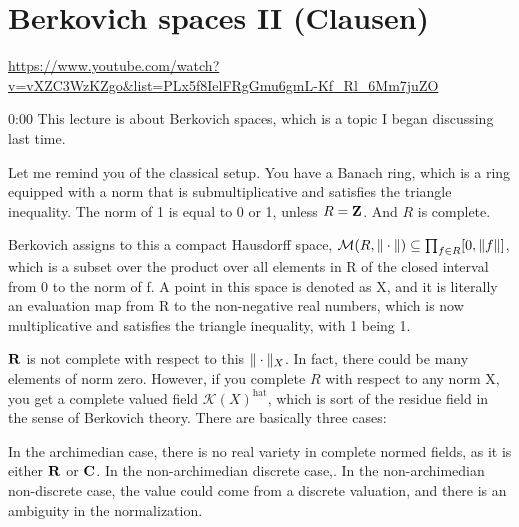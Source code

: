 
\section{\ufs Berkovich spaces II (Clausen)}

\url{https://www.youtube.com/watch?v=vXZC3WzKZgo&list=PLx5f8IelFRgGmu6gmL-Kf_Rl_6Mm7juZO}
\renewcommand{\yt}[2]{\href{https://www.youtube.com/watch?v=vXZC3WzKZgo&list=PLx5f8IelFRgGmu6gmL-Kf_Rl_6Mm7juZO&t=#1}{#2}}
\vspace{1em}

\begin{unfinished}{0:00}
This lecture is about Berkovich spaces, which is a topic I began discussing last time.

Let me remind you of the classical setup. You have a Banach ring, which is a ring equipped with a norm that is submultiplicative and satisfies the triangle inequality. The norm of 1 is equal to 0 or 1, unless $R = \mathbf Z$. And $R$ is complete.


Berkovich assigns to this a compact Hausdorff space, $\mathcal{M}(R, \| \cdot \|) \subseteq \prod_{f \in R} [ 0, \| f \| ]$, which is a subset over the product over all elements in R of the closed interval from 0 to the norm of f. A point in this space is denoted as X, and it is literally an evaluation map from R to the non-negative real numbers, which is now multiplicative and satisfies the triangle inequality, with 1 being 1.

\begin{remark}
$\R$ is not complete with respect to this $\norm{\cdot}_X$. In fact, there could be many elements of norm zero. However, if you complete $R$ with respect to any norm X, you get a complete valued field $\mathcal{K}(X)^{\text{hat}}$, which is sort of the residue field in the sense of Berkovich theory.
There are basically three cases:
\begin{enumerate}
\item archimedian $\iff$ $(\R, \norm{\cdot}^{\alpha})$ or $(\C, \norm{\cdot}^{\alpha)$, $\alpha \in [0, 1]$
\item non-archimedian but discrete, then you have the trivial norm $\norm{\cdot}_0 = \text{trivial norm}$
\item non-archimedian non-discrete, $\norm{\cdot}_{normalize}^{\alpha}$
\end{enumerate}
In the archimedian case, there is no real variety in complete normed fields, as it is either $\R$ or $\C$. In the non-archimedian discrete case,. In the non-archimedian non-discrete case, the value could come from a discrete valuation, and there is an ambiguity in the normalization.
\end{remark}


\end{unfinished}
